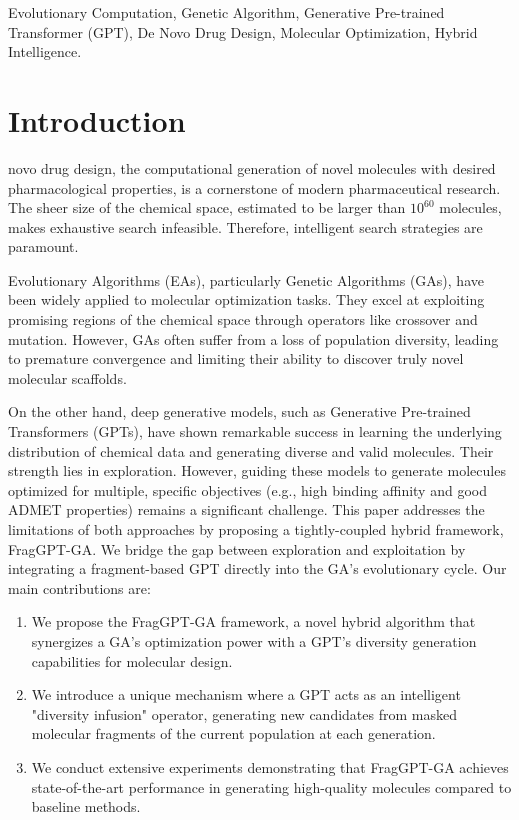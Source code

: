 \documentclass[lettersize,journal]{IEEEtran}
\begin{document}
\begin{IEEEkeywords}
Evolutionary Computation, Genetic Algorithm, Generative Pre-trained Transformer (GPT), De Novo Drug Design, Molecular Optimization, Hybrid Intelligence.
\end{IEEEkeywords}

\section{Introduction}
 novo drug design, the computational generation of novel molecules with desired pharmacological properties, is a cornerstone of modern pharmaceutical research. The sheer size of the chemical space, estimated to be larger than $10^{60}$ molecules, makes exhaustive search infeasible. Therefore, intelligent search strategies are paramount.

Evolutionary Algorithms (EAs), particularly Genetic Algorithms (GAs), have been widely applied to molecular optimization tasks. They excel at exploiting promising regions of the chemical space through operators like crossover and mutation. However, GAs often suffer from a loss of population diversity, leading to premature convergence and limiting their ability to discover truly novel molecular scaffolds.

On the other hand, deep generative models, such as Generative Pre-trained Transformers (GPTs), have shown remarkable success in learning the underlying distribution of chemical data and generating diverse and valid molecules. Their strength lies in exploration. However, guiding these models to generate molecules optimized for multiple, specific objectives (e.g., high binding affinity and good ADMET properties) remains a significant challenge.
\IEEEpubidadjcol 
This paper addresses the limitations of both approaches by proposing a tightly-coupled hybrid framework, FragGPT-GA. We bridge the gap between exploration and exploitation by integrating a fragment-based GPT directly into the GA's evolutionary cycle. Our main contributions are:
\begin{enumerate}
    \item We propose the FragGPT-GA framework, a novel hybrid algorithm that synergizes a GA's optimization power with a GPT's diversity generation capabilities for molecular design.
    \item We introduce a unique mechanism where a GPT acts as an intelligent "diversity infusion" operator, generating new candidates from masked molecular fragments of the current population at each generation.
    \item We conduct extensive experiments demonstrating that FragGPT-GA achieves state-of-the-art performance in generating high-quality molecules compared to baseline methods.
\end{enumerate}
\end{document}
